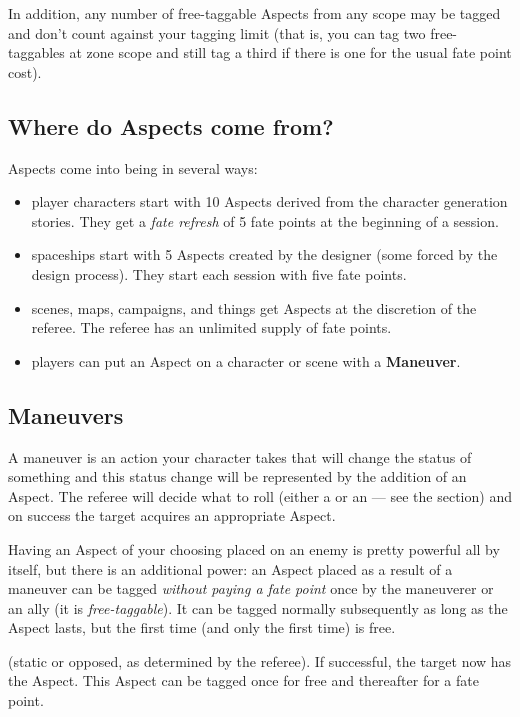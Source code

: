In addition, any number of free-taggable Aspects from any scope may be tagged and don't count against your tagging limit (that is, you can tag two free-taggables at zone scope and still tag a third if there is one for the usual fate point cost).

\subsection{Where do Aspects come from?}

Aspects come into being in several ways:
\begin{itemize}
\item player characters start with 10 Aspects derived from the character generation stories. They get a \emph{fate refresh} of 5 fate points at the beginning of a session.

\item spaceships start with 5 Aspects created by the designer (some forced by the design process). They start each session with five fate points.

\item scenes, maps, campaigns, and things get Aspects at the discretion of the referee. The referee has an unlimited supply of fate points.

\item players can put an Aspect on a character or scene with a \textbf{Maneuver}.
\end{itemize}

\subsection{Maneuvers}\label{sec:maneuvers} %

A maneuver is an action your character takes that will change the status of something and this status change will be represented by the addition of an Aspect. The referee will decide what to roll (either a  or an  --- see the  section) and on success the target acquires an appropriate Aspect.

Having an Aspect of your choosing placed on an enemy is pretty powerful all by itself, but there is an additional power: an Aspect placed as a result of a maneuver can be tagged \emph{without paying a fate point} once by the maneuverer or an ally (it is \emph{free-taggable}). It can be tagged normally subsequently as long as the Aspect lasts, but the first time (and only the first time) is free.

(static or opposed, as determined by the referee). If successful, the target now has the Aspect. This Aspect can be tagged once for free and thereafter for a fate point.

